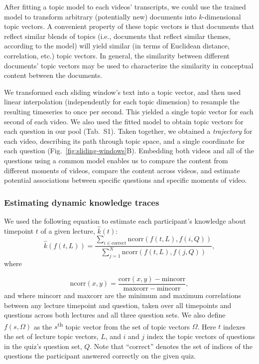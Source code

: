 \documentclass[10pt]{article}
\newcommand{\questions}{S1}
\begin{document}
After fitting a topic model to each videos' transcripts, we could use the
trained model to transform arbitrary (potentially new) documents into
$k$-dimensional topic vectors. A convenient property of these topic vectors is
that documents that reflect similar blends of topics (i.e., documents that
reflect similar themes, according to the model) will yield similar (in terms of
Euclidean distance, correlation, etc.) topic vectors. In general, the
similarity between different documents' topic vectors may be used to
characterize the similarity in conceptual content between the documents.

We transformed each sliding window's text into a topic vector, and then used
linear interpolation (independently for each topic dimension) to resample the
resulting timeseries to once per second. This yielded a single topic vector for
each second of each video. We also used the fitted model to obtain topic
vectors for each question in our pool (Tab.~\questions). Taken together, we
obtained a \textit{trajectory} for each video, describing its path through
topic space, and a single coordinate for each question
(Fig.~\ref{fig:sliding-windows}B). Embedding both videos and all of the
questions using a common model enables us to compare the content from different
moments of videos, compare the content across videos, and estimate potential
associations between specific questions and specific moments of video.


\subsubsection*{Estimating dynamic knowledge traces}

We used the following equation to estimate each participant's knowledge about
timepoint $t$ of a given lecture, $\hat{k}(t)$:
\begin{equation}
    \hat{k}\left(f(t, L)\right) = \frac{\sum_{i \in \mathrm{correct}}\mathrm{ncorr}\left(f(t, L), f(i, Q)\right)}{\sum_{j = 1}^N \mathrm{ncorr}\left(f(t, L), f(j, Q)\right)},
    \label{eqn:prop}
\end{equation}
where

\begin{equation}
    \mathrm{ncorr}(x, y) = \frac{\mathrm{corr}(x, y) - \mathrm{mincorr}}{\mathrm{maxcorr} - \mathrm{mincorr}},
\end{equation}
and where $\mathrm{mincorr}$ and $\mathrm{maxcorr}$ are the minimum and maximum
correlations between any lecture timepoint and question, taken over all
timepoints and questions across both lectures and all three question sets. We
also define $f(s, \Omega)$ as the $s$\textsuperscript{th} topic vector from the
set of topic vectors $\Omega$. Here $t$ indexes the set of lecture topic
vectors, $L$, and $i$ and $j$ index the topic vectors of questions in the
quiz's question set, $Q$. Note that ``correct'' denotes the set of indices of
the questions the participant answered correctly on the given quiz.
\end{document}
